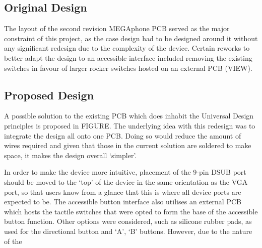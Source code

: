 
\subsection{Original Design}

The layout of the second revision MEGAphone PCB served as the major constraint of this project, as the case design had to be designed around it without any significant redesign due to the complexity of the device. Certain reworks to better adapt the design to an accessible interface included removing the existing switches in favour of larger rocker switches hosted on an external PCB (VIEW).

\subsection{Proposed Design}

A possible solution to the existing PCB which does inhabit the Universal Design principles is proposed in FIGURE. 
The underlying idea with this redesign was to integrate the design all onto one PCB. Doing so would reduce the amount of wires required and given that those in the current solution are soldered to make space, it makes the design overall ‘simpler’.

In order to make the device more intuitive, placement of the 9-pin DSUB port should be moved to the ‘top’ of the device in the same orientation as the VGA port, so that users know from a glance that this is where all device ports are expected to be.
The accessible button interface also utilises an external PCB which hosts the tactile switches that were opted to form the base of the accessible button function. 
Other options were considered, such as silicone rubber pads, as used for the directional button and ‘A’, ‘B’ buttons. However, due to the nature of the



